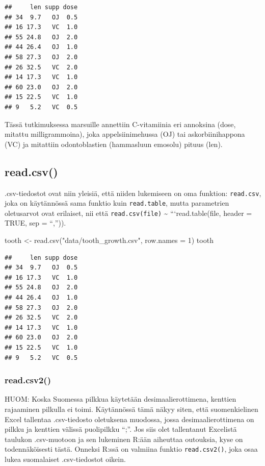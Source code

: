 \documentclass[
]{book}
\newenvironment{Shaded}{\begin{snugshade}}{\end{snugshade}}
\newcommand{\AttributeTok}[1]{\textcolor[rgb]{0.77,0.63,0.00}{#1}}
\newcommand{\DecValTok}[1]{\textcolor[rgb]{0.00,0.00,0.81}{#1}}
\newcommand{\FunctionTok}[1]{\textcolor[rgb]{0.00,0.00,0.00}{#1}}
\newcommand{\NormalTok}[1]{#1}
\newcommand{\OtherTok}[1]{\textcolor[rgb]{0.56,0.35,0.01}{#1}}
\newcommand{\StringTok}[1]{\textcolor[rgb]{0.31,0.60,0.02}{#1}}
\begin{document}
\begin{verbatim}
##     len supp dose
## 34  9.7   OJ  0.5
## 16 17.3   VC  1.0
## 55 24.8   OJ  2.0
## 44 26.4   OJ  1.0
## 58 27.3   OJ  2.0
## 26 32.5   VC  2.0
## 14 17.3   VC  1.0
## 60 23.0   OJ  2.0
## 15 22.5   VC  1.0
## 9   5.2   VC  0.5
\end{verbatim}

Tässä tutkimuksessa marsuille annettiin C-vitamiinia eri annoksina (dose, mitattu milligrammoina), joka appelsiinimehussa (OJ) tai askorbiinihappona (VC) ja mitattiin odontoblastien (hammasluun emosolu) pituus (len).

\hypertarget{read.csv}{%
\subsection{read.csv()}\label{read.csv}}

.csv-tiedostot ovat niin yleisiä, että niiden lukemiseen on oma funktion: \texttt{read.csv}, joka on käytännössä sama funktio kuin \texttt{read.table}, mutta parametrien oletusarvot ovat erilaiset, nii että \texttt{read.csv(file)} \textasciitilde{} ```read.table(file, header = TRUE, sep = ``,'')).

\begin{Shaded}
\begin{Highlighting}[]
\NormalTok{tooth }\OtherTok{\textless{}{-}} \FunctionTok{read.csv}\NormalTok{(}\StringTok{"data/tooth\_growth.csv"}\NormalTok{, }\AttributeTok{row.names =} \DecValTok{1}\NormalTok{)}
\NormalTok{tooth}
\end{Highlighting}
\end{Shaded}

\begin{verbatim}
##     len supp dose
## 34  9.7   OJ  0.5
## 16 17.3   VC  1.0
## 55 24.8   OJ  2.0
## 44 26.4   OJ  1.0
## 58 27.3   OJ  2.0
## 26 32.5   VC  2.0
## 14 17.3   VC  1.0
## 60 23.0   OJ  2.0
## 15 22.5   VC  1.0
## 9   5.2   VC  0.5
\end{verbatim}

\hypertarget{read.csv2}{%
\subsubsection{read.csv2()}\label{read.csv2}}

HUOM: Koska Suomessa pilkkua käytetään desimaalierottimena, kenttien rajaaminen pilkulla ei toimi. Käytännössä tämä näkyy siten, että suomenkielinen Excel tallentaa .csv-tiedosto oletuksena muodossa, jossa desimaalierottimena on pilkku ja kenttien välissä puolipilkku ``;''. Jos siis olet tallentanut Excelistä taulukon .csv-muotoon ja sen lukeminen R:ään aiheuttaa outouksia, kyse on todennäköisesti tästä. Onneksi R:ssä on valmiina funktio \texttt{read.csv2()}, joka osaa lukea suomalaiset .csv-tiedostot oikein.
\end{document}
